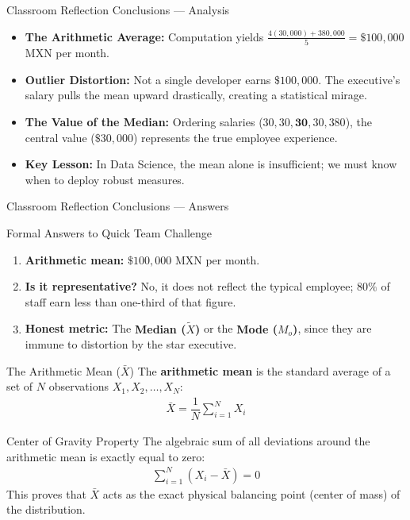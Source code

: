 \documentclass[aspectratio=169,xcolor={dvipsnames,table}]{beamer}
\begin{document}
\begin{frame}{Classroom Reflection Conclusions — Analysis}
  \begin{itemize}
    \item \textbf{The Arithmetic Average:} Computation yields $\frac{4(30,000) + 380,000}{5} = \$100,000$ MXN per month. \pause
    \item \textbf{Outlier Distortion:} Not a single developer earns $\$100,000$. The executive's salary pulls the mean upward drastically, creating a statistical mirage. \pause
    \item \textbf{The Value of the Median:} Ordering salaries ($30, 30, \mathbf{30}, 30, 380$), the central value ($\$30,000$) represents the true employee experience. \pause
    \item \textbf{Key Lesson:} In Data Science, the mean alone is insufficient; we must know when to deploy robust measures.
  \end{itemize}
\end{frame}

\begin{frame}{Classroom Reflection Conclusions — Answers}
  \begin{block}{Formal Answers to Quick Team Challenge}
    \begin{enumerate}
      \item \textbf{Arithmetic mean:} $\$100,000$ MXN per month. \pause
      \item \textbf{Is it representative?} No, it does not reflect the typical employee; $80\%$ of staff earn less than one-third of that figure. \pause
      \item \textbf{Honest metric:} The \textbf{Median ($\tilde{X}$)} or the \textbf{Mode ($M_o$)}, since they are immune to distortion by the star executive.
    \end{enumerate}
  \end{block}
\end{frame}

\begin{frame}{The Arithmetic Mean ($\bar{X}$)}
  \scriptsize
  \vspace{-0.15cm}
  The \textbf{arithmetic mean} is the standard average of a set of $N$ observations $X_1, X_2, \dots, X_N$:
  \begin{align}
    \bar{X} = \dfrac{1}{N} \sum_{i=1}^{N} X_i
  \end{align}
  \pause
  \begin{block}{Center of Gravity Property}
    The algebraic sum of all deviations around the arithmetic mean is exactly equal to zero:
    \begin{align}
      \sum_{i=1}^{N} (X_i - \bar{X}) = 0
    \end{align}
    This proves that $\bar{X}$ acts as the exact physical balancing point (center of mass) of the distribution.
  \end{block}
\end{frame}
\end{document}
